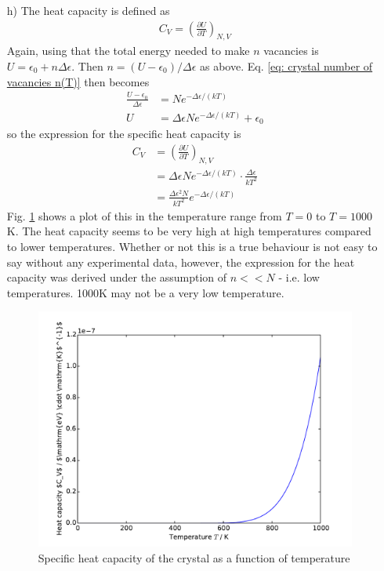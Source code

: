 \documentclass[11pt]{article}
\newcounter{excount}
\newenvironment{exercise}[1][]{\addtocounter{excount}{1} \noindent {\bf Exercise
    \arabic{excount} #1}\hspace{2mm}}{\vspace{4mm}}
\begin{document}
\begin{exercise}
\begin{itemize}
		
		\item[h)]
			The heat capacity is defined as
			\begin{align*}
				C_V = \left( \frac{\partial U}{\partial T} \right) _{N,V}
			\end{align*}
			Again, using that the total energy needed to make $n$ vacancies is $U=\epsilon_0+n\Delta \epsilon$. Then $n=(U-\epsilon_0)/\Delta \epsilon$ as above. Eq. \eqref{eq: crystal number of vacancies n(T)} then becomes
			\begin{align*}
				\frac{U-\epsilon_0}{\Delta \epsilon} &= Ne^{-\Delta \epsilon/(kT)} \\
				U &= \Delta \epsilon Ne^{-\Delta \epsilon /(kT)}  + \epsilon_0
			\end{align*}
			so the expression for the specific heat capacity is
			\begin{align*}
				C_V &=  \left( \frac{\partial U}{\partial T} \right) _{N,V} \\
				&= \Delta \epsilon Ne^{-\Delta \epsilon/(kT)} \cdot \frac{\Delta \epsilon}{kT^2} \\
				&= \frac{\Delta \epsilon^2 N}{kT^2}e^{-\Delta \epsilon /(kT)}
			\end{align*}
			Fig. \ref{fig: crystal heat capacity} shows a plot of this in the temperature range from $T=0$ to $T=1000$ K. The heat capacity seems to be very high at high temperatures compared to lower temperatures. Whether or not this is a true behaviour is not easy to say without any experimental data, however, the expression for the heat capacity was derived under the assumption of $n<<N$ - i.e. low temperatures. 1000K may not be a very low temperature.
			\begin{figure}[H]
				\centering
				\includegraphics[scale=0.7, clip=true, trim= 0 0 0 0]{FYS2160-oblig-3-fig-heat-capacity.pdf}
				\caption{Specific heat capacity of the crystal as a function of temperature}
				\label{fig: crystal heat capacity}
			\end{figure}
			
			
	\end{itemize}
\end{exercise}
\end{document}
